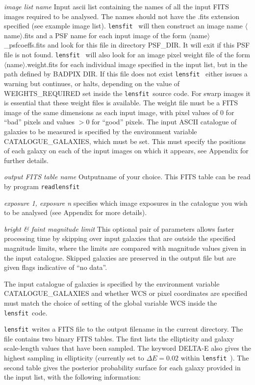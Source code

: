 \documentclass{article}
\def\lensfit{{\tt lensfit}\ }
\def\readlensfit{{\tt readlensfit}\ }
\def\<{{$\langle$}}
\def\>{{$\rangle$}}
\begin{document}
\begin{list}{}{\itemsep=0mm \leftmargin=5mm}
\item
{\em image list name} Input ascii list containing the names of all the input FITS images required to be analysed. 
The names should not have the .fits extension specified (see example image list). \lensfit 
will then construct an image name \<name\>.fits and a PSF name for each input image of the form 
\<name\>\_psfcoeffs.fits 
and look for this file in directory PSF\_DIR. It will exit if this PSF file is not found. \lensfit 
will also 
look for an image pixel weight file of the form \<name\>.weight.fits for each individual image specified in 
the input list, but in the path defined by BADPIX DIR. If this file does not exist \lensfit 
either issues a 
warning but continues, or halts, depending on the value of WEIGHTS\_REQUIRED set inside the 
\lensfit source code. For swarp images it is essential that these weight files is available. The weight file 
must be a FITS image of the same dimensions as each input image, with pixel values of 0 for ``bad'' pixels 
and values $> 0$ for ``good'' pixels. The input ASCII catalogue of galaxies to be measured is specified 
by the environment variable CATALOGUE\_GALAXIES, which must be set. This must specify the positions of each 
galaxy on each of the input images on which it appears, see Appendix for further details. 
\item
{\em output FITS table name} Outputname of your choice. This FITS table can be read by program \readlensfit 
\item
{\em exposure 1, exposure n} specifies which image exposures in the catalogue you wish to be analysed (see 
Appendix for more details). 
\item
{\em bright \& faint magnitude limit} This optional pair of parameters allows faster processing time by skipping over 
input galaxies that are outside
the specified magnitude limits, where the limits are compared with magnitude values given in the input catalogue.  
Skipped galaxies are preserved in the output file but are given flags indicative of ``no data''.
\end{list}

The input catalogue of galaxies is specified by the environment variable CATALOGUE\_GALAXIES and whether WCS 
or pixel coordinates are specified must match the choice of setting of the global variable WCS inside the 
\lensfit code. 

\lensfit writes a FITS file to the output filename in the current directory. The file contains 
two binary FITS tables. The first lists the ellipticity and galaxy scale-length values that have been sampled. 
The keyword DELTA-E also gives the highest sampling in ellipticity (currently set to $\Delta E =0.02$ within 
\lensfit ). The second table gives the posterior probability surface for each galaxy provided in the input 
list, with the following information: 
\end{document}
